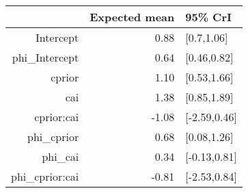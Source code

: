 \begin{tabular}{rrl}
  \hline
 & Expected mean & 95\% CrI \\ 
  \hline
Intercept & 0.88 & [0.7,1.06] \\ 
  phi\_Intercept & 0.64 & [0.46,0.82] \\ 
  cprior & 1.10 & [0.53,1.66] \\ 
  cai & 1.38 & [0.85,1.89] \\ 
  cprior:cai & -1.08 & [-2.59,0.46] \\ 
  phi\_cprior & 0.68 & [0.08,1.26] \\ 
  phi\_cai & 0.34 & [-0.13,0.81] \\ 
  phi\_cprior:cai & -0.81 & [-2.53,0.84] \\ 
   \hline
\end{tabular}

